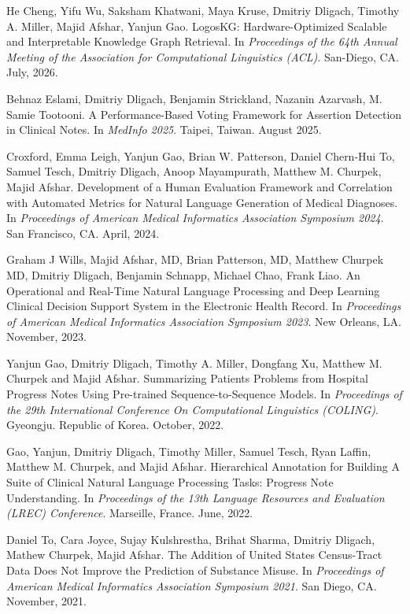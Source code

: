 \documentclass[letterpaper]{article}
\renewenvironment{itemize}{
  \begin{list}{}{
    \setlength{\leftmargin}{1.5em}
  }
}{
  \end{list}
}
\begin{document}
\begin{itemize}
\item He Cheng, Yifu Wu, Saksham Khatwani, Maya Kruse, Dmitriy Dligach, Timothy A. Miller, Majid Afshar, Yanjun Gao. LogosKG: Hardware-Optimized Scalable and Interpretable Knowledge Graph Retrieval. In \emph{Proceedings of the 64th Annual Meeting of the Association for Computational Linguistics (ACL)}. San-Diego, CA. July, 2026.
\item Behnaz Eslami, Dmitriy Dligach, Benjamin Strickland, Nazanin Azarvash, M. Samie Tootooni. A Performance-Based Voting Framework for Assertion Detection in Clinical Notes. In \emph{MedInfo 2025}. Taipei, Taiwan. August 2025.
\item Croxford, Emma Leigh, Yanjun Gao, Brian W. Patterson, Daniel Chern-Hui To, Samuel Tesch, Dmitriy Dligach, Anoop Mayampurath, Matthew M. Churpek, Majid Afshar. Development of a Human Evaluation Framework and Correlation with Automated Metrics for Natural Language Generation of Medical Diagnoses. In \emph{Proceedings of American Medical Informatics Association Symposium 2024}. San Francisco, CA. April, 2024.
\item Graham J Wills, Majid Afshar, MD, Brian Patterson, MD, Matthew Churpek MD, Dmitriy Dligach, Benjamin Schnapp, Michael Chao, Frank Liao. An Operational and Real-Time Natural Language Processing and Deep Learning Clinical Decision Support System in the Electronic Health Record. In \emph{Proceedings of American Medical Informatics Association Symposium 2023}. New Orleans, LA. November, 2023.
\item Yanjun Gao, Dmitriy Dligach, Timothy A. Miller, Dongfang Xu, Matthew M. Churpek and Majid Afshar. Summarizing Patients Problems from Hospital Progress Notes Using Pre-trained Sequence-to-Sequence Models. In \emph{Proceedings of the 29th International Conference On Computational Linguistics (COLING)}. Gyeongju. Republic of Korea. October, 2022.
\item Gao, Yanjun, Dmitriy Dligach, Timothy Miller, Samuel Tesch, Ryan Laffin, Matthew M. Churpek, and Majid Afshar. Hierarchical Annotation for Building A Suite of Clinical Natural Language Processing Tasks: Progress Note Understanding. In \emph{Proceedings of the 13th Language Resources and Evaluation (LREC) Conference}. Marseille, France. June, 2022.
\item Daniel To, Cara Joyce, Sujay Kulshrestha, Brihat Sharma, Dmitriy Dligach, Mathew Churpek, Majid Afshar. The Addition of United States Census-Tract Data Does Not Improve the Prediction of Substance Misuse. In \emph{Proceedings of American Medical Informatics Association Symposium 2021}. San Diego, CA. November, 2021.

\end{itemize}
\end{document}
